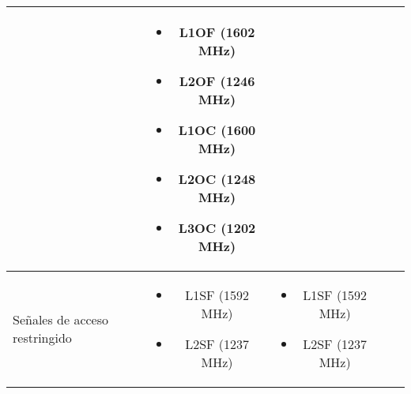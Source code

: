 \begin{justify}
\begin{table}[H]
\begin{tabular}{|p{3cm}|c|c|c|c|}
{{\begin{itemize}[label={}, leftmargin=0pt, topsep=0pt, partopsep=0pt, parsep=0pt, itemsep=0pt]
                    \end{itemize}
                }
            } &
            \parbox[t]{2.5cm}{
                \vspace{-7pt}
                {\fontsize{9}{11}\selectfont
                    \begin{itemize}[label={}, leftmargin=0pt, topsep=0pt, partopsep=0pt, parsep=0pt, itemsep=0pt]
                        \item L1OF (1602 MHz)
                        \item L2OF (1246 MHz)
                        \item L1OC (1600 MHz)
                        \item L2OC (1248 MHz)
                        \item L3OC (1202 MHz)
                    \end{itemize}
                    \vspace{10pt}
                }
            } \\
            \hline
            Señales de acceso restringido &
            \parbox[t]{2.5cm}{
                \vspace{-7pt}
                {\fontsize{9}{11}\selectfont
                    \begin{itemize}[label={}, leftmargin=0pt, topsep=0pt, partopsep=0pt, parsep=0pt, itemsep=0pt]
                        \item L1SF (1592 MHz)
                        \item L2SF (1237 MHz)
                    \end{itemize}
                }
            } &
            \parbox[t]{2.5cm}{
                \vspace{-7pt}
                {\fontsize{9}{11}\selectfont
                    \begin{itemize}[label={}, leftmargin=0pt, topsep=0pt, partopsep=0pt, parsep=0pt, itemsep=0pt]
                        \item L1SF (1592 MHz)
                        \item L2SF (1237 MHz)
                    \end{itemize}
                }
            } &
            \parbox[t]{2.5cm}{
                \vspace{-7pt}
                {\fontsize{9}{11}\selectfont
                    \begin{itemize}[label={}, leftmargin=0pt, topsep=0pt, partopsep=0pt, parsep=0pt, itemsep=0pt]

\end{itemize}}}
\end{tabular}
\end{table}
\end{justify}
